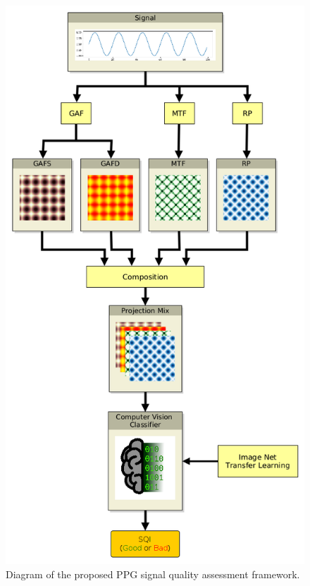 \begin{figure}[t]
	\centering
	\includegraphics[height=0.98\textheight]{img/method.png}
	\caption{Diagram of the proposed \acrlong{PPG} signal quality assessment framework.}
	\label{fig:method}
\end{figure}
